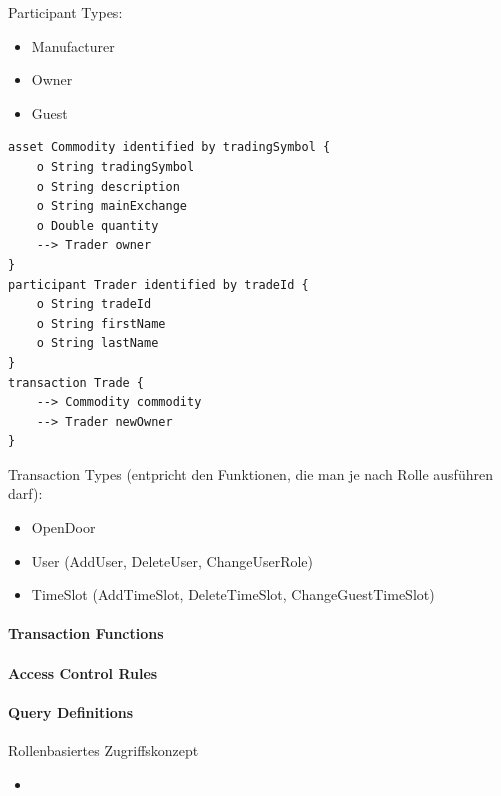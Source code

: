         Participant Types:
        \begin{itemize}[noitemsep]
            \item Manufacturer
            \item Owner
            \item Guest
        \end{itemize}
        \begin{lstlisting}[caption={Participant Types},label=participants,captionpos=b]
asset Commodity identified by tradingSymbol {
    o String tradingSymbol
    o String description
    o String mainExchange
    o Double quantity
    --> Trader owner
}
participant Trader identified by tradeId {
    o String tradeId
    o String firstName
    o String lastName
}
transaction Trade {
    --> Commodity commodity
    --> Trader newOwner
}
        \end{lstlisting}
        
        
        Transaction Types (entpricht den Funktionen, die man je nach Rolle ausführen darf):
        \begin{itemize}[noitemsep]
            \item OpenDoor
            \item User (AddUser, DeleteUser, ChangeUserRole)
            \item TimeSlot (AddTimeSlot, DeleteTimeSlot, ChangeGuestTimeSlot)
        \end{itemize}
    
    \paragraph{Transaction Functions}
    
    \paragraph{Access Control Rules}
    
    \paragraph{Query Definitions}
    
    Rollenbasiertes Zugriffskonzept
    \begin{itemize}[noitemsep]
        \item 
    \end{itemize}